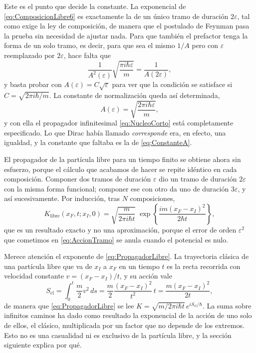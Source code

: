         Este es el punto que decide la constante. La exponencial de \eqref{eq:ComposicionLibre6} es exactamente la de un único tramo de duración $2\varepsilon$, tal como exige la ley de composición, de manera que el postulado de Feynman pasa la prueba sin necesidad de ajustar nada. Para que también el prefactor tenga la forma de un solo tramo, es decir, para que sea el mismo $1/A$ pero con $\varepsilon$ reemplazado por $2\varepsilon$, hace falta que
        \begin{equation}\label{eq:CondicionA}
            \frac{1}{A^{2}(\varepsilon)}\sqrt{\frac{\pi i \hbar \varepsilon}{m}} = \frac{1}{A(2\varepsilon)},
        \end{equation}
        y basta probar con $A(\varepsilon) = C\sqrt{\varepsilon}$ para ver que la condición se satisface si $C = \sqrt{2\pi i\hbar/m}$. La constante de normalización queda así determinada,
        \begin{equation}\label{eq:ConstanteA}
            A(\varepsilon) = \sqrt{\frac{2\pi i\hbar\varepsilon}{m}},
        \end{equation}
        y con ella el propagador infinitesimal \eqref{eq:NucleoCorto} está completamente especificado. Lo que Dirac había llamado \textit{corresponde} era, en efecto, una igualdad, y la constante que faltaba es la de \eqref{eq:ConstanteA}.

        El propagador de la partícula libre para un tiempo finito se obtiene ahora sin esfuerzo, porque el cálculo que acabamos de hacer se repite idéntico en cada composición. Componer dos tramos de duración $\varepsilon$ dio un tramo de duración $2\varepsilon$ con la misma forma funcional; componer ese con otro da uno de duración $3\varepsilon$, y así sucesivamente. Por inducción, tras $N$ composiciones,
        \begin{equation}\label{eq:PropagadorLibre}
            K_{\text{libre}}(x_{F},t;x_{I},0) = \sqrt{\frac{m}{2\pi i\hbar t}}\;\exp\left\{\frac{im\left(x_{F}-x_{I}\right)^{2}}{2\hbar t}\right\},
        \end{equation}
        que es un resultado exacto y no una aproximación, porque el error de orden $\varepsilon^{2}$ que cometimos en \eqref{eq:AccionTramo} se anula cuando el potencial es nulo.

        Merece atención el exponente de \eqref{eq:PropagadorLibre}. La trayectoria clásica de una partícula libre que va de $x_{I}$ a $x_{F}$ en un tiempo $t$ es la recta recorrida con velocidad constante $v = (x_{F}-x_{I})/t$, y su acción vale
        \begin{equation}\label{eq:AccionLibre}
            S_{\mathrm{cl}} = \int_{0}^{t}\frac{m}{2}v^{2}\,ds = \frac{m}{2}\frac{\left(x_{F}-x_{I}\right)^{2}}{t^{2}}\,t = \frac{m\left(x_{F}-x_{I}\right)^{2}}{2t},
        \end{equation}
        de manera que \eqref{eq:PropagadorLibre} se lee $K = \sqrt{m/2\pi i\hbar t}\,e^{iS_{\mathrm{cl}}/\hbar}$. La suma sobre infinitos caminos ha dado como resultado la exponencial de la acción de uno solo de ellos, el clásico, multiplicada por un factor que no depende de los extremos. Esto no es una casualidad ni es exclusivo de la partícula libre, y la sección siguiente explica por qué.

